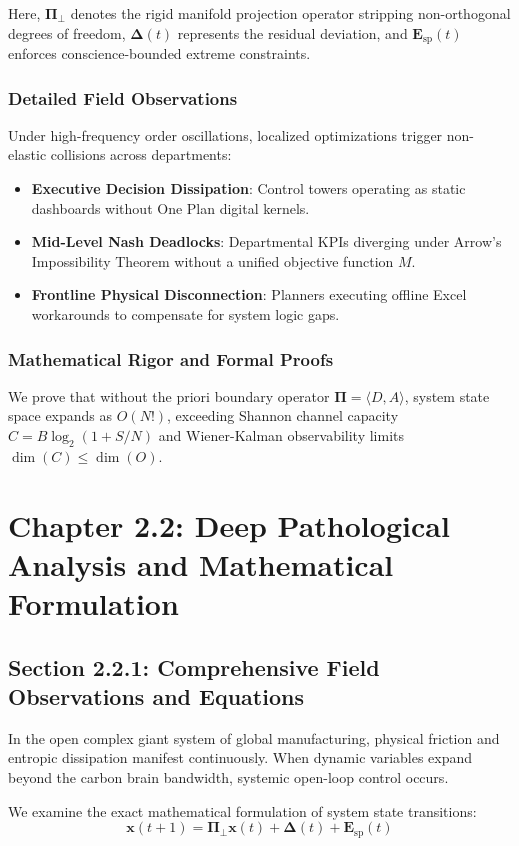 \documentclass[12pt,a4paper,oneside]{book}
\begin{document}
Here, $\mathbf{\Pi}_{\bot}$ denotes the rigid manifold projection operator stripping non-orthogonal degrees of freedom, $\mathbf{\Delta}(t)$ represents the residual deviation, and $\mathbf{E}_{\mathrm{sp}}(t)$ enforces conscience-bounded extreme constraints.

\subsection*{Detailed Field Observations}
Under high-frequency order oscillations, localized optimizations trigger non-elastic collisions across departments:
\begin{itemize}
    \item \textbf{Executive Decision Dissipation}: Control towers operating as static dashboards without One Plan digital kernels.
    \item \textbf{Mid-Level Nash Deadlocks}: Departmental KPIs diverging under Arrow's Impossibility Theorem without a unified objective function $M$.
    \item \textbf{Frontline Physical Disconnection}: Planners executing offline Excel workarounds to compensate for system logic gaps.
\end{itemize}

\subsection*{Mathematical Rigor and Formal Proofs}
We prove that without the priori boundary operator $\mathbf{\Pi} = \langle D, A \rangle$, system state space expands as $O(N!)$, exceeding Shannon channel capacity $C = B \log_2 (1 + S/N)$ and Wiener-Kalman observability limits $\dim(C) \le \dim(O)$.
\clearpage
\chapter{Chapter 2.2: Deep Pathological Analysis and Mathematical Formulation}
\section{Section 2.2.1: Comprehensive Field Observations and Equations}

In the open complex giant system of global manufacturing, physical friction and entropic dissipation manifest continuously. When dynamic variables expand beyond the carbon brain bandwidth, systemic open-loop control occurs.

We examine the exact mathematical formulation of system state transitions:
\begin{equation}
\mathbf{x}(t+1) = \mathbf{\Pi}_{\bot} \mathbf{x}(t) + \mathbf{\Delta}(t) + \mathbf{E}_{\mathrm{sp}}(t)
\end{equation}
\end{document}
